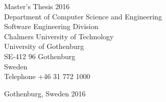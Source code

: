 Master's Thesis 2016\\	%
Department of Computer Science and Engineering\\
Software Engineering Division\\
Chalmers University of Technology\\
University of Gothenburg\\
SE-412 96 Gothenburg\\
Sweden\\
Telephone +46 31 772 1000 \setlength{\parskip}{0.5cm}

\vfill

Gothenburg, Sweden 2016

